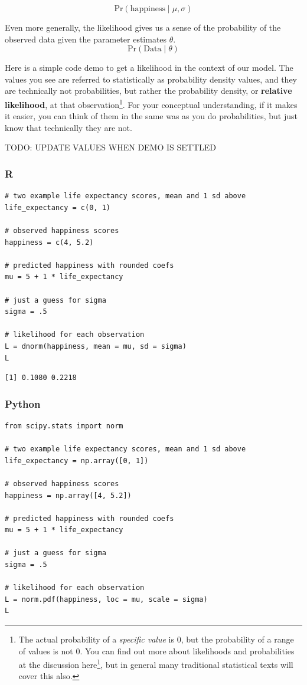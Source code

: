 \documentclass[
  letterpaper,
]{krantz}
\DeclareRobustCommand{\href}[2]{#2\footnote{\url{#1}}}
\begin{document}
\[
\textrm{Pr}(\textrm{happiness} \mid \mu, \sigma)
\]

Even more generally, the likelihood gives us a sense of the probability
of the observed data given the parameter estimates \(\theta\). \[
\textrm{Pr}(\textrm{Data} \mid \theta)
\]

Here is a simple code demo to get a likelihood in the context of our
model. The values you see are referred to statistically as probability
density values, and they are technically not probabilities, but rather
the probability density, or \textbf{relative likelihood}, at that
observation\footnote{The actual probability of a \emph{specific value}
  is 0, but the probability of a range of values is not 0. You can find
  out more about likelihoods and probabilities at the discussion
  \href{https://stats.stackexchange.com/questions/2641/what-is-the-difference-between-likelihood-and-probability}{here},
  but in general many traditional statistical texts will cover this
  also.}. For your conceptual understanding, if it makes it easier, you
can think of them in the same was as you do probabilities, but just know
that technically they are not.

TODO: UPDATE VALUES WHEN DEMO IS SETTLED

\subsubsection{R}

\begin{verbatim}
# two example life expectancy scores, mean and 1 sd above
life_expectancy = c(0, 1)

# observed happiness scores
happiness = c(4, 5.2)

# predicted happiness with rounded coefs
mu = 5 + 1 * life_expectancy

# just a guess for sigma
sigma = .5

# likelihood for each observation
L = dnorm(happiness, mean = mu, sd = sigma)
L
\end{verbatim}

\begin{verbatim}
[1] 0.1080 0.2218
\end{verbatim}

\subsubsection{Python}

\begin{verbatim}
from scipy.stats import norm

# two example life expectancy scores, mean and 1 sd above
life_expectancy = np.array([0, 1])

# observed happiness scores
happiness = np.array([4, 5.2])

# predicted happiness with rounded coefs
mu = 5 + 1 * life_expectancy

# just a guess for sigma
sigma = .5

# likelihood for each observation
L = norm.pdf(happiness, loc = mu, scale = sigma)
L
\end{verbatim}
\end{document}

